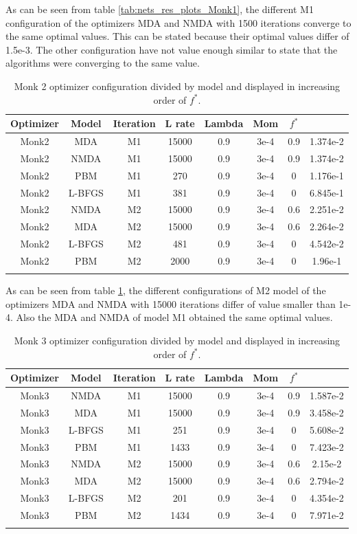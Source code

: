 As can be seen from table \ref{tab:nets_res_plots_Monk1}, the different M1 configuration of the optimizers MDA and NMDA with 1500 iterations converge to the same optimal values. This can be stated because their optimal values differ of 1.5e-3. The other configuration have not value enough similar to state that the algorithms were converging to the same value.


\begin{longtable}{|c|c|c|c|c|c|c|c|}
	\hline
	\centering
	\textbf{Optimizer}&\textbf{Model} &\textbf{Iteration} & \textbf{L rate} & \multicolumn{1}{l|}{\textbf{Lambda}} & \textbf{Mom} & \textbf{$f^{*}$} \\ \hline 
	Monk2 & MDA & M1 & 15000 & 0.9 & 3e-4  & 0.9 & 1.374e-2 		\\
	Monk2 & NMDA & M1 & 15000 & 0.9 & 3e-4  & 0.9 &  1.374e-2 	\\
	Monk2 & PBM & M1 & 270 & 0.9 & 3e-4  & 0 & 1.176e-1  				\\
	Monk2 & L-BFGS & M1 & 381 & 0.9 & 3e-4  & 0 & 6.845e-1 			\\
	Monk2 & NMDA & M2 & 15000 & 0.9 & 3e-4  & 0.6 & 2.251e-2 	\\
	Monk2 & MDA & M2 & 15000 & 0.9 & 3e-4  & 0.6 & 2.264e-2 		\\
	Monk2 & L-BFGS & M2 & 481 & 0.9 & 3e-4  & 0 & 4.542e-2 			\\
	Monk2 & PBM & M2 & 2000 & 0.9 & 3e-4  & 0 & 1.96e-1 				\\
	\hline
	\caption{Monk 2 optimizer configuration divided by model and displayed in increasing order of $f^*$.}
	\label{tab:nets_res_plots_Monk2}
\end{longtable}

As can be seen from table \ref{tab:nets_res_plots_Monk2}, the different configurations of M2 model of the optimizers MDA and NMDA with 15000 iterations differ of value smaller than 1e-4. Also the MDA and NMDA of model M1 obtained the same optimal values.


\begin{longtable}{|c|c|c|c|c|c|c|c|}
	\hline
	\centering
	\textbf{Optimizer}&\textbf{Model} &\textbf{Iteration} & \textbf{L rate} & \multicolumn{1}{l|}{\textbf{Lambda}} & \textbf{Mom} & \textbf{$f^{*}$} \\ \hline 
	Monk3 & NMDA & M1 & 15000 & 0.9 & 3e-4  & 0.9 & 1.587e-2 \\
	Monk3 & MDA & M1 & 15000 & 0.9 & 3e-4  & 0.9 & 3.458e-2 	\\
	Monk3 & L-BFGS & M1 & 251 & 0.9 & 3e-4  & 0 & 5.608e-2 		\\
	Monk3 & PBM & M1 & 1433 & 0.9 & 3e-4  & 0 & 7.423e-2 		\\
	Monk3 & NMDA & M2 & 15000 & 0.9 & 3e-4  & 0.6 & 2.15e-2 	\\
	Monk3 & MDA & M2 & 15000 & 0.9 & 3e-4  & 0.6 & 2.794e-2 	\\
	Monk3 & L-BFGS & M2 & 201 & 0.9 & 3e-4  & 0 & 4.354e-2 		\\
	Monk3 & PBM & M2 & 1434 & 0.9 & 3e-4  & 0 & 7.971e-2 		\\
	\hline
	\caption{Monk 3 optimizer configuration divided by model and displayed in increasing order of $f^*$.}
	\label{tab:nets_res_plots_Monk3}
\end{longtable}

